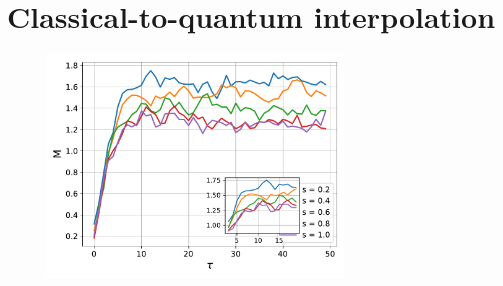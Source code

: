 \section{Classical-to-quantum interpolation}

\label{sec:classical_to_quantum}

\begin{figure}
    \centering
    \includegraphics[width=0.7\textwidth]{figures/slide_broken/thermalisation.pdf}
    \caption{}
    \label{fig:thermalisation_different_noise_fracs}
\end{figure}

